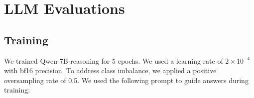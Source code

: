 \documentclass{article} %
\newcommand{\csnote}[1]{\textcolor{cspink}{CS: #1}}
\begin{document}



\section{LLM Evaluations}
\label{app:llm-evals}

\subsection{Training}
We trained Qwen-7B-reasoning for 5 epochs. We used a learning rate of $2\times 10^{-4}$ with bf16 precision. To address class imbalance, we applied a positive oversampling rate of 0.5. 
We used the following prompt to guide answers during training: 
\end{document}
